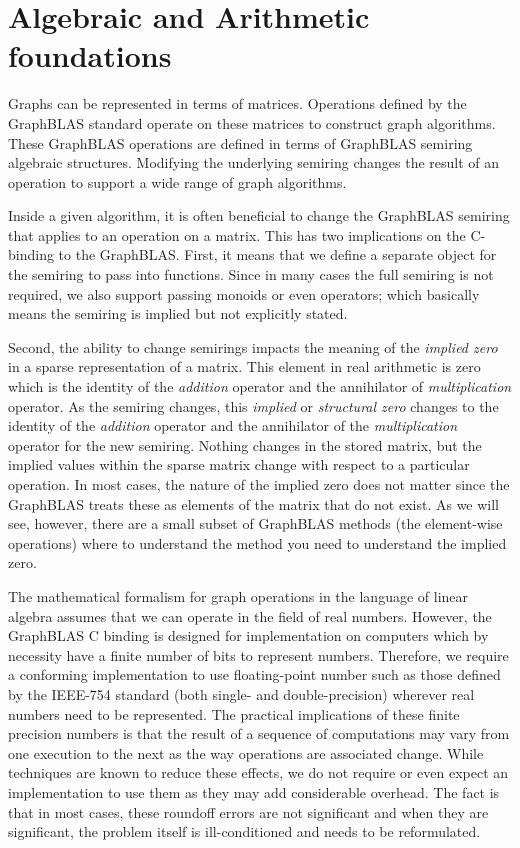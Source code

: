 \section{Algebraic and Arithmetic foundations}

Graphs can be represented in terms of matrices. Operations defined by the GraphBLAS standard
operate on these matrices to construct graph algorithms.
These GraphBLAS operations are defined in terms of GraphBLAS semiring algebraic 
structures. Modifying the underlying semiring changes the result of 
an operation to support a wide range of graph algorithms.

Inside a given algorithm, it is often beneficial to change the GraphBLAS semiring
that applies to an operation on a matrix.  This has two 
implications on the C-binding to the GraphBLAS.  First,
it means that we define a separate object for the semiring 
to pass into functions.  Since in many cases the full
semiring is not required, we also support passing monoids or
even operators; which basically means the semiring is implied but not 
explicitly stated.

Second, the ability to change semirings impacts the meaning of 
the \emph{implied zero} in a sparse representation of a matrix.
This element in real arithmetic is zero which is the 
identity of the \emph{addition} operator and the annihilator of
\emph{multiplication} operator.   As the semiring changes, this 
\emph{implied} or \emph{structural zero} changes to the identity of 
the \emph{addition} operator and the annihilator of the \emph{multiplication} 
operator for the new semiring.   Nothing changes in the
stored matrix, but the implied values within the sparse matrix change
with respect to a particular operation.  In most cases, the nature
of the implied zero does not matter since the GraphBLAS treats these
as elements of the matrix that do not exist.  As we will see, however,
there are a small subset of GraphBLAS methods 
(the element-wise operations) where to understand 
the method you need to understand the implied zero.

The mathematical formalism for graph operations in the language of 
linear algebra assumes that we can operate in the field of real numbers. 
However, the GraphBLAS C binding is designed for implementation on computers 
which by necessity have a finite number of bits to represent numbers. 
Therefore, we require a conforming implementation to use floating-point 
number such as those defined by the IEEE-754 standard (both single- and double-precision) 
wherever real numbers need to be represented. The practical implications of 
these finite precision numbers is that the result of a sequence of 
computations may vary from one execution to the next as the way 
operations are associated change. While techniques are known to 
reduce these effects, we do not require or even expect an implementation 
to use them as they may add considerable overhead. The fact is that in most 
cases, these roundoff errors are not significant and when they are significant, 
the problem itself is ill-conditioned and needs to be reformulated.

